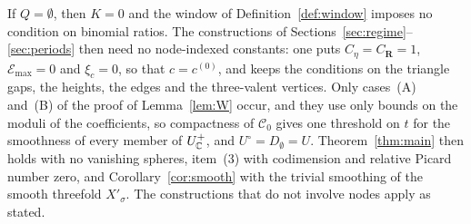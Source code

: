 \begin{remark}\label{rem:nonodes}
If $Q=\emptyset$, then $K=0$ and the window of Definition~\ref{def:window} imposes no condition on binomial ratios. The
constructions of Sections~\ref{sec:regime}--\ref{sec:periods} then need no node-indexed constants: one puts
$C_\eta=C_{\mathbf R}=1$, $\mathcal E_{\max}=0$ and $\xi_c=0$, so that $c=c^{(0)}$, and keeps the conditions on the triangle
gaps, the heights, the edges and the three-valent vertices. Only cases~(A) and~(B) of the proof of Lemma~\ref{lem:W}
occur, and they use only bounds on the moduli of the coefficients, so compactness of $\mathscr C_0$ gives one threshold on $t$ for the smoothness of every member of
$U^+_\mathbb C$, and $U^\circ=D_\emptyset=U$. Theorem~\ref{thm:main} then holds with no vanishing spheres, item~(3) with
codimension and relative Picard number zero, and Corollary~\ref{cor:smooth} with the trivial smoothing of the smooth
threefold $X'_\sigma$. The constructions that do not involve nodes apply as stated.
\end{remark}





